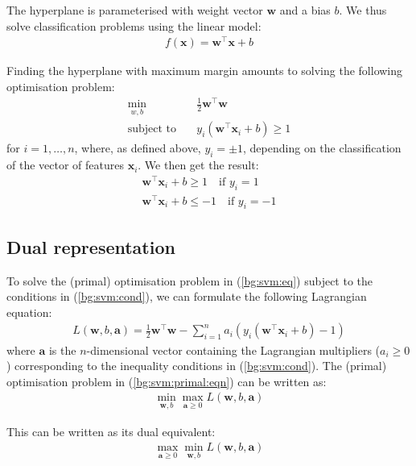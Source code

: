 \documentclass[12pt, twoside, a4paper]{report}
\def\vec{\boldsymbol}
\begin{document}
The hyperplane is parameterised with weight vector $\boldsymbol w$ and a bias $b$. We thus solve classification problems using the linear model:
\begin{align}
f(\vec{x}) = \vec{w}^\top \vec{x} + b \label{bg:svm:linear_model}
\end{align}

Finding the hyperplane with maximum margin amounts to solving the following optimisation problem:
\begin{align}
\min_{w, b} \quad &\frac{1}{2} \boldsymbol w^\top \boldsymbol w \label{bg:svm:eq} \\
\text{subject to} \quad & y_i(\boldsymbol w^\top \boldsymbol x_i + b) \geq 1 \label{bg:svm:cond} 
\end{align}
for $i = 1, \dots , n$, where, as defined above, $y_i = \pm 1$, depending on the classification of the vector of features $\boldsymbol x_i$. We then get the result:
\begin{gather*}
\boldsymbol w^\top \boldsymbol x_i + b \geq 1 \quad \text{if $y_i = 1$} \\
\boldsymbol w^\top \boldsymbol x_i + b \leq -1 \quad \text{if $y_i = -1$}
\end{gather*}


\subsection{Dual representation}
To solve the (primal) optimisation problem in (\ref{bg:svm:eq}) subject to the conditions in (\ref{bg:svm:cond}), we can formulate the following Lagrangian equation:
\begin{align}
L(\boldsymbol w, b, \boldsymbol a)
= \frac{1}{2} \boldsymbol w^\top \boldsymbol w - \sum_{i=1}^n a_i (y_i(\boldsymbol w^\top \boldsymbol x_i + b) - 1) \label{bg:svm:primal:eqn}
\end{align}
where $\boldsymbol a$ is the $n$-dimensional vector containing the Lagrangian multipliers ($a_i \geq 0$) corresponding to the inequality conditions in (\ref{bg:svm:cond}). The (primal) optimisation problem in (\ref{bg:svm:primal:eqn}) can be written as:
\begin{align}
\min_{\boldsymbol w, b} \max_{\boldsymbol a \geq 0} L(\boldsymbol w, b, \vec a) \label{bg:svm:primal}
\end{align}

This can be written as its dual equivalent:
\begin{align}
\max_{\vec a \geq 0} \min_{\vec w, b} L(\vec w, b, \vec a) \label{bg:svm:dual}
\end{align}
\end{document}
